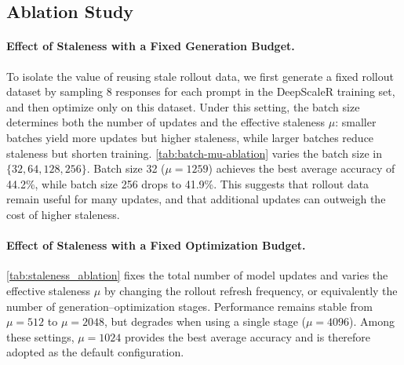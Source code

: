 

\subsection{Ablation Study}



\paragraph{Effect of Staleness with a Fixed Generation Budget.}
To isolate the value of reusing stale rollout data, we first generate a fixed
rollout dataset by sampling 8 responses for each prompt in the DeepScaleR
training set, and then optimize only on this dataset. Under this setting, the batch size determines both the number of updates and the
effective staleness $\mu$: smaller batches yield more updates but higher
staleness, while larger batches reduce staleness but shorten training.
\cref{tab:batch-mu-ablation} varies the batch size in $\{32,64,128,256\}$.
Batch size 32 ($\mu=1259$) achieves the best average accuracy of 44.2\%, while
batch size 256 drops to 41.9\%. This suggests that rollout data remain useful
for many updates, and that additional updates can outweigh the cost of
higher staleness.


\paragraph{Effect of Staleness with a Fixed Optimization Budget.}
\cref{tab:staleness_ablation} fixes the total number of model updates and varies
the effective staleness $\mu$ by changing the rollout refresh frequency, or
equivalently the number of generation--optimization stages. Performance remains
stable from $\mu\!=\!512$ to $\mu\!=\!2048$, but degrades when using a single stage
($\mu\!=\!4096$). Among these settings, $\mu\!=\!1024$ provides the best average
accuracy and is therefore adopted as the
default configuration.






